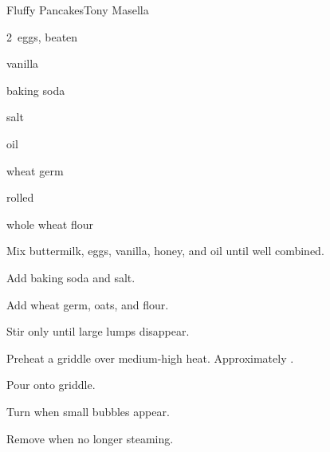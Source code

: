 \begin{recipe}{Fluffy Pancakes}{Tony Masella}{}

\begin{ingredients}
\item {} 
\item 2~eggs, beaten
\item {} vanilla
\item {} baking soda
\item \tp{\half} salt
\item \C{\quarter} oil
\item \C{\quarter} 
\item \C{\quarter} wheat germ
\item \C{\quarter} rolled 
\item \C{1\half} whole wheat flour
\end{ingredients}

\begin{directions}
\item Mix buttermilk, eggs, vanilla, honey, and oil until well combined.
\item Add baking soda and salt.
\item Add wheat germ, oats, and flour.
\item Stir only until large lumps disappear.
\item Preheat a griddle over medium-high heat. Approximately .
\item Pour onto griddle.
\item Turn when small bubbles appear.
\item Remove when no longer steaming.
\end{directions}

\end{recipe}

